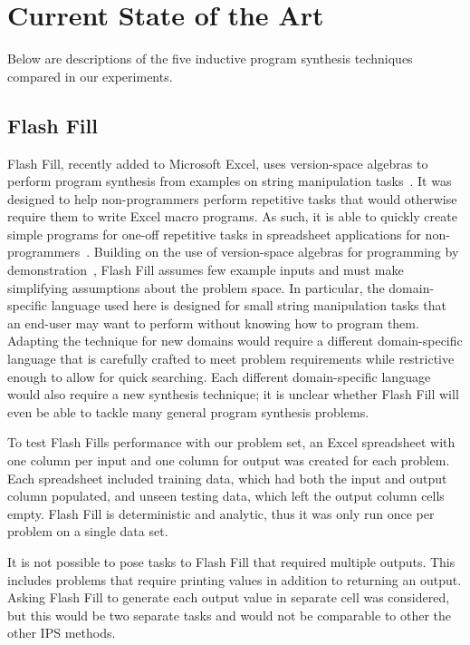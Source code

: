 \section{Current State of the Art}

Below are descriptions of the five inductive program synthesis techniques compared in our experiments.

\subsection{Flash Fill}

Flash Fill, recently added to Microsoft Excel, uses version-space algebras to perform program synthesis from examples on string manipulation tasks~\cite{Gulwani2011}. It was designed to help non-programmers perform repetitive tasks that would otherwise require them to write Excel macro programs. As such, it is able to quickly create simple programs for one-off repetitive tasks in spreadsheet applications for non-programmers~\cite{Gulwani:2012:SDM:2240236.2240260, harris2011spreadsheet, Singh:2012:LSS:2212351.2212356, singh2012synthesizing}. Building on the use of version-space algebras for programming by demonstration~\cite{lau2003programming}, Flash Fill assumes few example inputs and must make simplifying assumptions about the problem space. In particular, the domain-specific language used here is designed for small string manipulation tasks that an end-user may want to perform without knowing how to program them. Adapting the technique for new domains would require a different domain-specific language that is carefully crafted to meet problem requirements while restrictive enough to allow for quick searching. Each different domain-specific language would also require a new synthesis technique; it is unclear whether Flash Fill will even be able to tackle many general program synthesis problems.

To test Flash Fills performance with our problem set, an Excel spreadsheet with one column per input and one column for output was created for each problem. Each spreadsheet included training data, which had both the input and output column populated, and unseen testing data, which left the output column cells empty. Flash Fill is deterministic and analytic, thus it was only run once per problem on a single data set.

It is not possible to pose tasks to Flash Fill that required multiple outputs. This includes problems that require printing values in addition to returning an output. Asking Flash Fill to generate each output value in separate cell was considered, but this would be two separate tasks and would not be comparable to other the other IPS methods.

